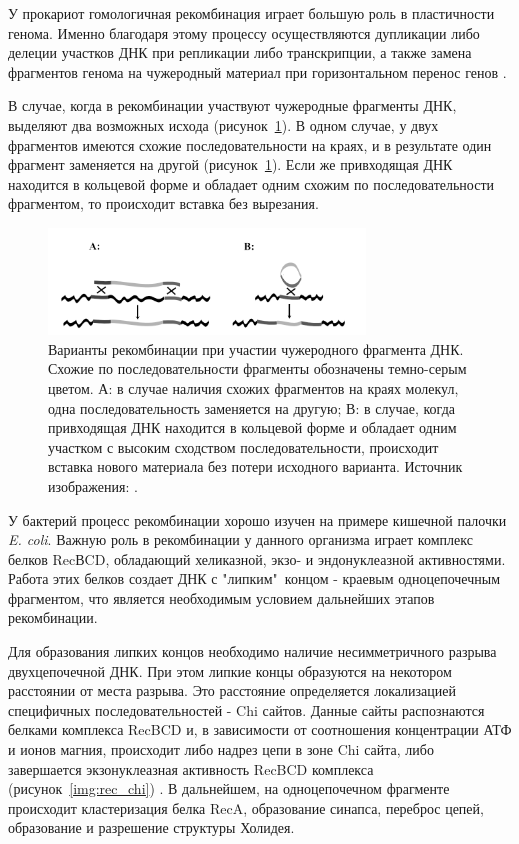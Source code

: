 У прокариот гомологичная рекомбинация играет большую роль в пластичности генома. Именно благодаря этому процессу осуществляются дупликации либо делеции участков ДНК при репликации либо транскрипции, а также замена фрагментов генома на чужеродный материал при горизонтальном перенос генов \cite{ochman2000lateral}. 

В случае, когда в рекомбинации участвуют чужеродные фрагменты ДНК, выделяют два возможных исхода (рисунок~\ref{img:dco_sco}). В одном случае, у двух фрагментов имеются схожие последовательности на краях, и в результате один фрагмент заменяется на другой (рисунок~\ref{img:dco_sco}). Если же привходящая ДНК находится в кольцевой форме и обладает одним схожим по последовательности фрагментом, то происходит вставка без вырезания. 

\begin{figure}[!ht] 
  \center
    \includegraphics [width=0.75\textwidth] {Dissertation/images/lit/recombination/recombination_dco_sco.png}
    \caption{Варианты рекомбинации при участии чужеродного фрагмента ДНК. Схожие по последовательности фрагменты обозначены темно-серым цветом. А: в случае наличия схожих фрагментов на краях молекул, одна последовательность заменяется на другую; В: в случае, когда привходящая ДНК находится в кольцевой форме и обладает одним участком с высоким сходством последовательности, происходит вставка нового материала без потери исходного варианта. Источник изображения: \cite{mullany2005dynamic}.}
    \label{img:dco_sco}
\end{figure}

У бактерий процесс рекомбинации хорошо изучен на примере кишечной палочки \textit{E. coli}. Важную роль в рекомбинации у данного организма играет комплекс белков RecВCD, обладающий хеликазной, экзо- и эндонуклеазной активностями. Работа этих белков создает ДНК с "липким"\ концом - краевым одноцепочечным фрагментом, что является необходимым условием дальнейших этапов рекомбинации. 

Для образования липких концов необходимо наличие несимметричного разрыва двухцепочечной ДНК. При этом липкие концы образуются на некотором расстоянии от места разрыва. Это расстояние определяется локализацией специфичных последовательностей - Chi сайтов. Данные сайты распознаются белками комплекса RecBCD и, в зависимости от соотношения концентрации АТФ и ионов магния, происходит либо надрез цепи в зоне Chi сайта, либо завершается экзонуклеазная активность RecBCD комплекса (рисунок~\ref{img:rec_chi}) \cite{smith2012recbcd, singleton2004crystal}. В дальнейшем, на одноцепочечном фрагменте происходит кластеризация белка RecA, образование синапса, переброс цепей, образование и разрешение структуры Холидея. 

